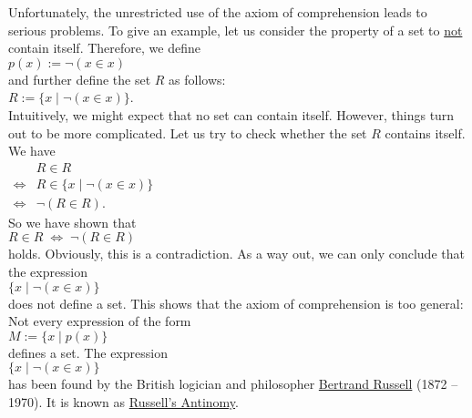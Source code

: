 Unfortunately, the unrestricted use of the axiom of comprehension leads to serious problems.  To give an
example, let us consider the property of a set to \underline{not} contain itself.  Therefore, we define  
\\[0.2cm]
\hspace*{1.3cm}
 $p(x) := \neg(x \in x)$ 
\\[0.2cm]
and further define the set $R$ as follows: 
\\[0.2cm]
\hspace*{1.3cm} 
$R := \{ x \;|\; \neg (x \in x) \}$.  
\\[0.2cm]
Intuitively, we might expect that no set can contain itself.  However, things turn out to be more complicated.
Let us try to check whether the set $R$ contains itself.  We have
\\[0.2cm]
\hspace*{1.3cm}
$
\begin{array}{cl}
                  & R \in R \\[0.2cm] 
  \Leftrightarrow & R \in \bigl\{ x \;|\; \neg (x \in x) \bigr\} \\[0.2cm] 
  \Leftrightarrow & \neg (R \in R).
\end{array}
$
\\[0.2cm]
So we have shown that
\\[0.2cm]
\hspace*{1.3cm}
$R \in R \;\Leftrightarrow\; \neg(R \in R)$
\\[0.2cm]
holds.  Obviously, this is a contradiction.  As a way out, we can only conclude that the expression \\[0.2cm]
\hspace*{1.3cm} $\{ x \mid \neg (x \in x) \}$ \\[0.2cm]
does not define a set.  This shows that the axiom of comprehension is too general:  Not every expression of the form 
\\[0.2cm] 
\hspace*{1.3cm}
$M := \{ x \mid p(x) \}$ 
\\[0.2cm]
defines a set.  The expression
\\[0.2cm]
\hspace*{1.3cm}
$\bigl\{x \mid \neg(x \in x)\bigr\}$
\\[0.2cm]
has been found by the British logician and philosopher 
\href{http://de.wikipedia.org/wiki/Bertrand_Russell}{Bertrand Russell} (1872 -- 1970).  It is known as
\href{http://de.wikipedia.org/wiki/Russellsche_Antinomy}{Russell's Antinomy}. 

